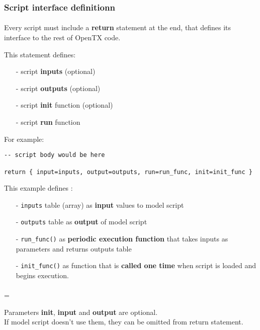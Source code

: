 \documentclass[a4paper,french,10pt]{article}
\newenvironment{info}
  {\par\begin{mdframed}[linewidth=2pt,linecolor=blue]%
    \begin{list}{}{\leftmargin=1cm
                   \labelwidth=\leftmargin}\item[\color{blue}\Large\ding{43}]}
  {\end{list}\end{mdframed}\par}
\begin{document}
\subsubsection{Script interface definitionn}
\paragraph{}
Every script must include a \textbf{return} statement at the end, that defines its interface to the rest of OpenTX code. 

This statement defines:
\begin{itemize}[leftmargin=*,itemsep=5mm,nolistsep]
\item[-] script \textbf{inputs} (optional)
\item[-] script \textbf{outputs} (optional)
\item[-] script \textbf{init} function (optional)
\item[-] script \textbf{run} function
\end{itemize}

For example:
\begin{lstlisting}[caption={A dummy Lua script}]
-- script body would be here

return { input=inputs, output=outputs, run=run_func, init=init_func }
\end{lstlisting}

This example defines : 

\begin{itemize}[leftmargin=*,itemsep=5mm,nolistsep]
\item[-] \texttt{inputs} table (array) as \textbf{input} values to model script
\item[-] \texttt{outputs} table as \textbf{output} of model script
\item[-] \texttt{run\_func()} as \textbf{periodic execution function} that takes inputs as parameters and returns outputs table
\item[-] \texttt{init\_func()} as function that is \textbf{called one time} when script is loaded and begins execution.
\end{itemize}
\paragraph{}
\begin{info}
Parameters \textbf{init}, \textbf{input} and \textbf{output} are optional. \\ If model script doesn't use them, they can be omitted from return statement. 
\end{info}
\end{document}
